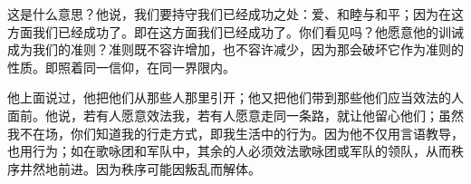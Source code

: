 \par

这是什么意思？他说，我们要持守我们已经成功之处：爱、和睦与和平；因为在这方面我们已经成功了。即在这方面我们已经成功了。你们看见吗？他愿意他的训诫成为我们的准则？准则既不容许增加，也不容许减少，因为那会破坏它作为准则的性质。即照着同一信仰，在同一界限内。\par

\par

他上面说过，他把他们从那些人那里引开；他又把他们带到那些他们应当效法的人面前。他说，若有人愿意效法我，若有人愿意走同一条路，就让他留心他们；虽然我不在场，你们知道我的行走方式，即我生活中的行为。因为他不仅用言语教导，也用行为；如在歌咏团和军队中，其余的人必须效法歌咏团或军队的领队，从而秩序井然地前进。因为秩序可能因叛乱而解体。\par

